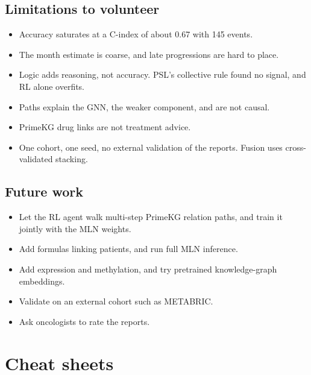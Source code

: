 \documentclass[11pt,a4paper]{article}
\begin{document}
\subsection{Limitations to volunteer}
\begin{itemize}
  \item Accuracy saturates at a C-index of about 0.67 with 145 events.
  \item The month estimate is coarse, and late progressions are hard to place.
  \item Logic adds reasoning, not accuracy. PSL's collective rule found no signal, and RL alone overfits.
  \item Paths explain the GNN, the weaker component, and are not causal.
  \item PrimeKG drug links are not treatment advice.
  \item One cohort, one seed, no external validation of the reports. Fusion uses cross-validated stacking.
\end{itemize}

\subsection{Future work}
\begin{itemize}
  \item Let the RL agent walk multi-step PrimeKG relation paths, and train it jointly with the MLN weights.
  \item Add formulas linking patients, and run full MLN inference.
  \item Add expression and methylation, and try pretrained knowledge-graph embeddings.
  \item Validate on an external cohort such as METABRIC.
  \item Ask oncologists to rate the reports.
\end{itemize}

\section{Cheat sheets}
\end{document}
